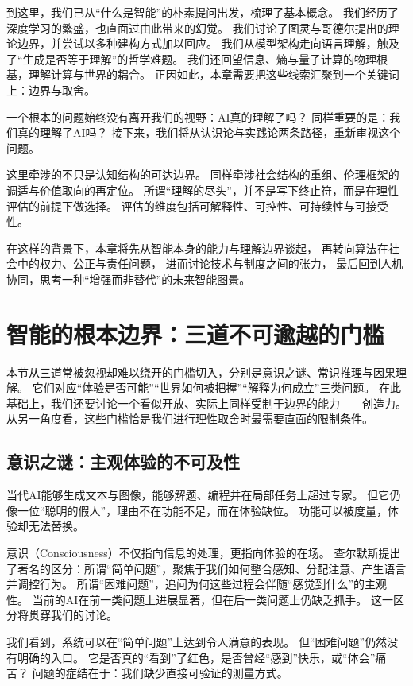 到这里，我们已从“什么是智能”的朴素提问出发，梳理了基本概念。
我们经历了深度学习的繁盛，也直面过由此带来的幻觉。
我们讨论了图灵与哥德尔提出的理论边界，并尝试以多种建构方式加以回应。
我们从模型架构走向语言理解，触及了“生成是否等于理解”的哲学难题。
我们还回望信息、熵与量子计算的物理根基，理解计算与世界的耦合。
正因如此，本章需要把这些线索汇聚到一个关键词上：边界与取舍。

一个根本的问题始终没有离开我们的视野：AI真的理解了吗？
同样重要的是：我们真的理解了AI吗？
接下来，我们将从认识论与实践论两条路径，重新审视这个问题。

这里牵涉的不只是认知结构的可达边界。
同样牵涉社会结构的重组、伦理框架的调适与价值取向的再定位。
所谓“理解的尽头”，并不是写下终止符，而是在理性评估的前提下做选择。
评估的维度包括可解释性、可控性、可持续性与可接受性。

在这样的背景下，本章将先从智能本身的能力与理解边界谈起，
再转向算法在社会中的权力、公正与责任问题，
进而讨论技术与制度之间的张力，
最后回到人机协同，思考一种“增强而非替代”的未来智能图景。

\section{智能的根本边界：三道不可逾越的门槛}

本节从三道常被忽视却难以绕开的门槛切入，分别是意识之谜、常识推理与因果理解。
它们对应“体验是否可能”“世界如何被把握”“解释为何成立”三类问题。
在此基础上，我们还要讨论一个看似开放、实际上同样受制于边界的能力——创造力。
从另一角度看，这些门槛恰是我们进行理性取舍时最需要直面的限制条件。

\subsection{意识之谜：主观体验的不可及性}

当代AI能够生成文本与图像，能够解题、编程并在局部任务上超过专家。
但它仍像一位“聪明的假人”，理由不在功能不足，而在体验缺位。
功能可以被度量，体验却无法替换。

意识（Consciousness）不仅指向信息的处理，更指向体验的在场。
查尔默斯提出了著名的区分：所谓“简单问题”，聚焦于我们如何整合感知、分配注意、产生语言并调控行为。
所谓“困难问题”，追问为何这些过程会伴随“感觉到什么”的主观性。
当前的AI在前一类问题上进展显著，但在后一类问题上仍缺乏抓手。
这一区分将贯穿我们的讨论。

我们看到，系统可以在“简单问题”上达到令人满意的表现。
但“困难问题”仍然没有明确的入口。
它是否真的“看到”了红色，是否曾经“感到”快乐，或“体会”痛苦？
问题的症结在于：我们缺少直接可验证的测量方式。

